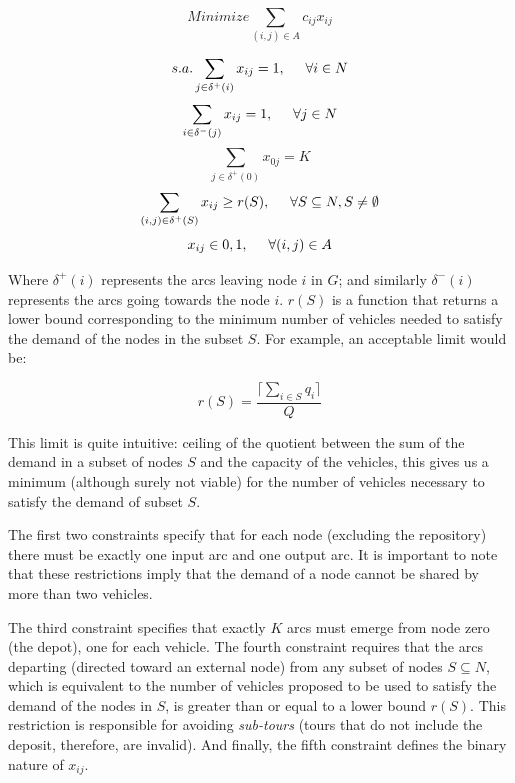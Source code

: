 \documentclass{amsart}
\begin{document}
            \begin{equation}
                Minimize \sum_{(i, j) \in A} c_{ij} x_{ij}
            \end{equation}

            \[s.a. \sum_{j \in \delta^+ (i)} x_{ij} = 1, \hspace{0.5cm} \forall i \in N\]
            \[\sum_{i \in \delta^- (j)} x_{ij} = 1, \hspace{0.5cm} \forall j \in N\]
            \[\sum_{j \in \delta^+ (0)} x_{0j} = K\]
            \[\sum_{(i,j) \in \delta^+ (S)} x_{ij} \geq r(S),  \hspace{0.5cm} \forall S \subseteq N, S \neq \emptyset\]
            \[x_{ij} \in {0, 1}, \hspace{0.5cm} \forall (i, j) \in A\]

            Where $\delta^+ (i)$ represents the arcs leaving node $i$ in $G$; and similarly $\delta^- (i)$ represents the arcs going towards the node $i$. $r(S)$ is a function that returns a lower bound corresponding to the minimum number of vehicles needed to satisfy the demand of the nodes in the subset $S$. For example, an acceptable limit would be:
            
            \[r(S) = \frac{\lceil \sum_{i\in S} q_i \rceil}{Q}\]
            
            This limit is quite intuitive: ceiling of the quotient between the sum of the demand in a subset of nodes $S$ and the capacity of the vehicles, this gives us a minimum (although surely not viable) for the number of vehicles necessary to satisfy the demand of subset $S$.

            The first two constraints specify that for each node (excluding the repository) there must be exactly one input arc and one output arc. It is important to note that these restrictions imply that the demand of a node cannot be shared by more than two vehicles.
            
            The third constraint specifies that exactly $K$ arcs must emerge from node zero (the depot), one for each vehicle. The fourth constraint requires that the arcs departing (directed toward an external node) from any subset of nodes $S \subseteq N$, which is equivalent to the number of vehicles proposed to be used to satisfy the demand of the nodes in $ S$, is greater than or equal to a lower bound $r(S)$. This restriction is responsible for avoiding \textit{sub-tours} (tours that do not include the deposit, therefore, are invalid). And finally, the fifth constraint defines the binary nature of $x_{ij}$.
\end{document}
